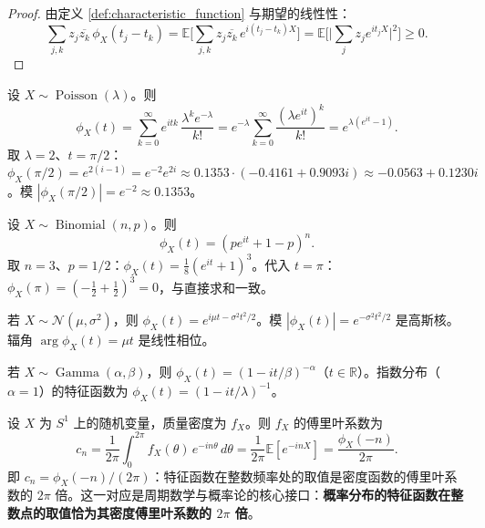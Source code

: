 \begin{proof}
由定义 \ref{def:characteristic_function} 与期望的线性性：
\[
\sum_{j,k} z_j \overline{z_k}\, \phi_X(t_j - t_k)
= \mathbb{E}\Big[ \sum_{j,k} z_j \overline{z_k}\, e^{i(t_j - t_k) X} \Big]
= \mathbb{E}\Big[ \Big| \sum_{j} z_j e^{it_j X} \Big|^2 \Big] \ge 0.
\]
\end{proof}

\begin{example}[泊松分布特征函数的具体计算]\label{ch14_poisson_char_example}
设 $X \sim \operatorname{Poisson}(\lambda)$。则
\[
\phi_X(t) = \sum_{k=0}^{\infty} e^{itk}\, \frac{\lambda^k e^{-\lambda}}{k!}
= e^{-\lambda} \sum_{k=0}^{\infty} \frac{(\lambda e^{it})^k}{k!}
= e^{\lambda (e^{it} - 1)}.
\]
取 $\lambda = 2$、$t = \pi/2$：$\phi_X(\pi/2) = e^{2(i-1)} = e^{-2} e^{2i} \approx 0.1353 \cdot (-0.4161 + 0.9093 i) \approx -0.0563 + 0.1230 i$。模 $|\phi_X(\pi/2)| = e^{-2} \approx 0.1353$。
\end{example}

\begin{example}[二项分布特征函数的具体计算]\label{ch14_binomial_char_example}
设 $X \sim \operatorname{Binomial}(n, p)$。则
\[
\phi_X(t) = (p e^{it} + 1 - p)^n.
\]
取 $n = 3$、$p = 1/2$：$\phi_X(t) = \tfrac18 (e^{it} + 1)^3$。代入 $t = \pi$：$\phi_X(\pi) = (-\tfrac12 + \tfrac12)^3 = 0$，与直接求和一致。
\end{example}

\begin{example}[正态分布的特征函数]\label{ex:normal_characteristic}
若 $X \sim \mathcal{N}(\mu, \sigma^2)$，则 $\phi_X(t) = e^{i\mu t - \sigma^2 t^2/2}$。模 $|\phi_X(t)| = e^{-\sigma^2 t^2/2}$ 是高斯核。辐角 $\arg \phi_X(t) = \mu t$ 是线性相位。
\end{example}

\begin{example}[伽马分布的特征函数]\label{ex:gamma_characteristic}
若 $X \sim \operatorname{Gamma}(\alpha, \beta)$，则 $\phi_X(t) = (1 - it/\beta)^{-\alpha}$（$t \in \mathbb{R}$）。指数分布（$\alpha = 1$）的特征函数为 $\phi_X(t) = (1 - it/\lambda)^{-1}$。
\end{example}

\begin{remark}[特征函数在整数频率处的取值]\label{ch14_periodic_series_interface}
设 $X$ 为 $S^1$ 上的随机变量，质量密度为 $f_X$。则 $f_X$ 的傅里叶系数为
\[
c_n = \frac{1}{2\pi} \int_0^{2\pi} f_X(\theta)\, e^{-in\theta}\, d\theta = \frac{1}{2\pi}\mathbb{E}[e^{-inX}] = \frac{\phi_X(-n)}{2\pi}.
\]
即 $c_n = \phi_X(-n)/(2\pi)$：特征函数在整数频率处的取值是密度函数的傅里叶系数的 $2\pi$ 倍。这一对应是周期数学与概率论的核心接口：\textbf{概率分布的特征函数在整数点的取值恰为其密度傅里叶系数的 $2\pi$ 倍}。
\end{remark}


